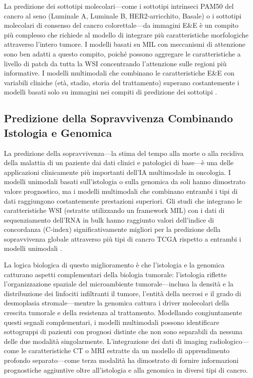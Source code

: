 La predizione dei sottotipi molecolari---come i sottotipi intrinseci PAM50 del cancro al seno (Luminale A, Luminale B, HER2-arricchito, Basale) o i sottotipi molecolari di consenso del cancro colorettale---da immagini E\&E è un compito più complesso che richiede al modello di integrare più caratteristiche morfologiche attraverso l'intero tumore. I modelli basati su MIL con meccanismi di attenzione sono ben adatti a questo compito, poiché possono aggregare le caratteristiche a livello di patch da tutta la WSI concentrando l'attenzione sulle regioni più informative. I modelli multimodali che combinano le caratteristiche E\&E con variabili cliniche (età, stadio, storia del trattamento) superano costantemente i modelli basati solo su immagini nei compiti di predizione dei sottotipi \cite{lu2020}.

\subsection{Predizione della Sopravvivenza Combinando Istologia e Genomica}

La predizione della sopravvivenza---la stima del tempo alla morte o alla recidiva della malattia di un paziente dai dati clinici e patologici di base---è una delle applicazioni clinicamente più importanti dell'IA multimodale in oncologia. I modelli unimodali basati sull'istologia o sulla genomica da soli hanno dimostrato valore prognostico, ma i modelli multimodali che combinano entrambi i tipi di dati raggiungono costantemente prestazioni superiori. Gli studi che integrano le caratteristiche WSI (estratte utilizzando un framework MIL) con i dati di sequenziamento dell'RNA in bulk hanno raggiunto valori dell'indice di concordanza (C-index) significativamente migliori per la predizione della sopravvivenza globale attraverso più tipi di cancro TCGA rispetto a entrambi i modelli unimodali \cite{song2023}.

La logica biologica di questo miglioramento è che l'istologia e la genomica catturano aspetti complementari della biologia tumorale: l'istologia riflette l'organizzazione spaziale del microambiente tumorale---inclusa la densità e la distribuzione dei linfociti infiltranti il tumore, l'entità della necrosi e il grado di desmoplasia stromale---mentre la genomica cattura i driver molecolari della crescita tumorale e della resistenza al trattamento. Modellando congiuntamente questi segnali complementari, i modelli multimodali possono identificare sottogruppi di pazienti con prognosi distinte che non sono separabili da nessuna delle due modalità singolarmente. L'integrazione dei dati di imaging radiologico---come le caratteristiche CT o MRI estratte da un modello di apprendimento profondo separato---come terza modalità ha dimostrato di fornire informazioni prognostiche aggiuntive oltre all'istologia e alla genomica in diversi tipi di cancro.

